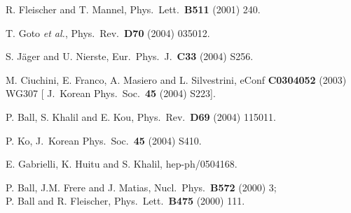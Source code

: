 \documentclass[11pt]{cernrep}
\begin{document}
\begin{thebibliography}{999}
R. Fleischer and T. Mannel,
 { Phys.\ Lett.}~{\bf B511} (2001) 240.

T. Goto {\it et al.}, 
  { Phys.\ Rev.}~{\bf D70} (2004) 035012.
  
S. J\"ager and U. Nierste,
  { Eur.\ Phys.\ J.}~{\bf C33} (2004) S256.
  
 M. Ciuchini, E. Franco, A. Masiero and L. Silvestrini,
  { eConf} {\bf C0304052} (2003) WG307 
  [{ J.\ Korean Phys.\ Soc.}~{\bf 45} (2004) S223].

P. Ball, S. Khalil and E. Kou,
  { Phys.\ Rev.}~{\bf D69} (2004) 115011.

P. Ko,
  { J.\ Korean Phys.\ Soc.}~{\bf 45} (2004) S410.

E. Gabrielli, K. Huitu and S. Khalil,
  hep-ph/0504168.

P. Ball, J.M. Frere and J. Matias,
  { Nucl.\ Phys.}~{\bf B572} (2000) 3;\\
  P. Ball and R. Fleischer,
  { Phys.\ Lett.}~{\bf B475} (2000) 111.


\end{thebibliography}
\end{document}
